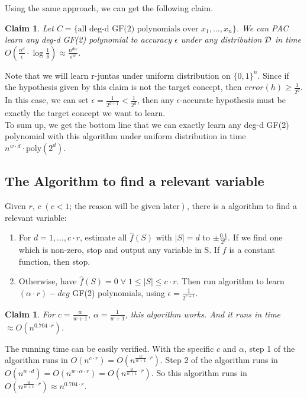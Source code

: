 \documentclass[12pt]{article}
\newtheorem{claim}[theorem]{Claim}
\newcommand{\cald}{{\cal D}}
\newcommand{\poly}{\mathrm{poly}}
\begin{document}
Using the same approach, we can get the following claim.

\begin{claim}
Let $C = \{ \text{all deg-d GF(2) polynomials over } x_1,...,x_n
\}$. We can PAC learn any deg-d GF(2) polynomial to accuracy
$\epsilon$ under any distribution $\cald$ in time $O(\frac
{n^d}{\epsilon} \cdot \log {\frac {1}{\delta}}) \approx \frac
{n^{dw}}{\epsilon^w}$.
\end{claim}

Note that we will learn r-juntas under uniform distribution on $\{ 0,1
\}^n$. Since if the hypothesis given by this claim is not the target
concept, then $error(h) \ge \frac {1}{2^d}$. In this case, we can set
$\epsilon  = \frac {1}{2^{d+1}} < \frac {1}{2^d}$, then any
$\epsilon$-accurate hypothesis must be exactly the target concept we
want to learn. \\

To sum up, we get the bottom line that we can exactly learn any deg-d
GF(2) polynomial with this algorithm under uniform distribution in
time $n^{w \cdot d} \cdot \poly (2^d)$.

\subsection{The Algorithm to find a relevant variable}

Given $r$, $c \; (c < 1 \text{; the reason will be given later})$,
there is a algorithm to find a relevant variable:

\begin{enumerate}
\item For $d = 1,..., c \cdot r$, estimate all $\hat {f}(S)$ with $|S|
  = d$ to $\pm \frac {0.1}{2^r}$. If we find one which is non-zero,
  stop and output any variable in S. If $f$ is a constant function,
  then stop.
\item Otherwise, have $\hat {f}(S) = 0 \; \forall \; 1 \le |S| \le c
  \cdot r$. Then run algorithm to learn $(\alpha \cdot r)-deg$ GF(2)
  polynomials, using $\epsilon = \frac {1}{2^{r+1}}$.
\end{enumerate}

\begin{claim}
For $c = \frac {w}{w+1}$, $\alpha = \frac {1}{w+1}$, this algorithm
works. And it runs in time $\approx O(n^{0.704 \cdot r})$.
\end{claim}

The running time can be easily verified. With the specific $c$ and
$\alpha$, step 1 of the algorithm runs in $O(n^{c \cdot r}) =
O(n^{\frac {w}{w+1} \cdot r})$. Step 2 of the algorithm runs in
$O(n^{w \cdot d}) = O(n^{w \cdot \alpha \cdot r}) = O(n^{\frac
  {w}{w+1} \cdot r})$. So this algorithm runs in $O(n^{\frac {w}{w+1}
  \cdot r}) \approx n^{0.704 \cdot r}$. \\
\end{document}
